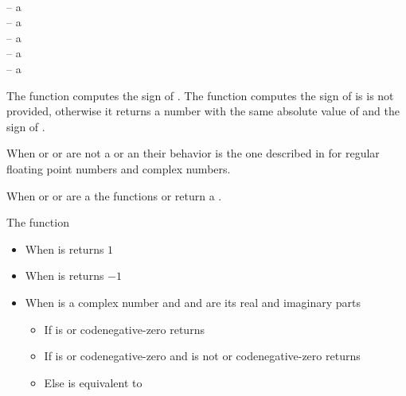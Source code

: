 \documentclass[../Comparisons-Predicates.tex]{subfiles}
\begin{document}


    \DSyntax{}

      \RArrow {}\\
       
    \RArrow {}


    \DArgsNValues{}

     -- a \\
     -- a \\
     -- a \\
     -- a \\
     -- a 


    \DDescription{}

    The function  computes the sign of . The function
     computes the sign of  is  is not
    provided, otherwise it returns a number with the same absolute value of
     and the sign of .

    \noindent
    When  or  or  are not a
     or an
     their behavior is the one described in
    \cite{1996:ANSIHyperSpec} for regular floating point numbers and complex
    numbers.

    \noindent
    When  or  or  are a  the functions  or  return a
    .

    \noindent
    The function 
    \begin{itemize}
        \item When  is  returns $1$
        \item When  is  returns $-1$
        \item When  is a complex number and  and
         are its real and imaginary parts
        \begin{itemize}
            \item If  is  or
            code{negative-zero} returns  \code{))))}
            \item If  is  or
            code{negative-zero} and  is not  or
            code{negative-zero} returns  \code{))))}
            \item Else is equivalent to   \code{))))}
        \end{itemize}
    \end{itemize}
\end{document}
